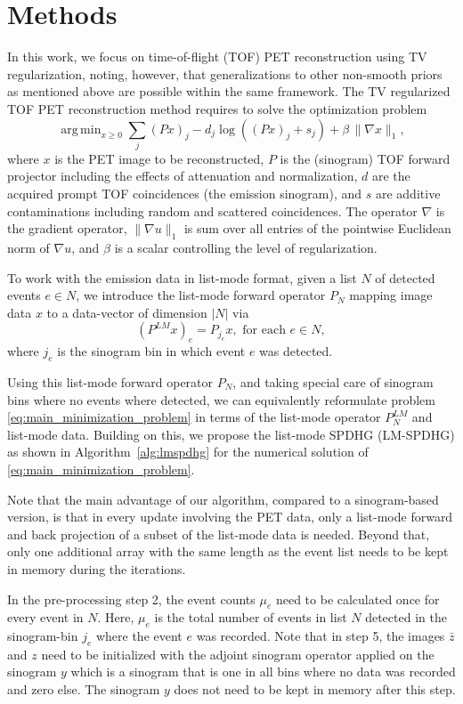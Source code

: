\documentclass{IEEEtran}
\DeclareMathOperator*{\argmin}{arg\,min}
\begin{document}
\section{Methods}

In this work, we focus on time-of-flight (TOF) PET reconstruction using TV regularization, 
noting, however, that generalizations to other non-smooth priors as mentioned above are possible 
within the same framework. 
The TV regularized TOF PET reconstruction method requires to solve the optimization problem
%
\begin{equation} \label{eq:main_minimization_problem}
\argmin _{x\geq 0} \sum_j (Px)_j -  d_j \log \left( (Px)_ j + s_j \right) + \beta \, \|\nabla x\|_{1},
\end{equation}
%
where $x$ is the PET image to be reconstructed, $P$ is the (sinogram) TOF forward projector including 
the effects of attenuation and normalization, $d$ are the acquired prompt TOF coincidences 
(the emission sinogram), and $s$ are additive contaminations including random and scattered coincidences.
The operator $\nabla$ is the gradient operator, $\|\nabla u \|_1$ is sum over all entries of the 
pointwise Euclidean norm of $\nabla u$, and $\beta$ is a scalar controlling the level of regularization.

To work with the emission data in list-mode format, given a list $N$ of detected events $e \in N$, we introduce the list-mode forward operator $P_N$ mapping image data $x$ to a data-vector of dimension $|N|$ via
\[ (P^{LM}x)_e  = P_{j_e}x , \text{ for each }e \in N,\]
where $j_e$ is the sinogram bin in which event $e$ was detected.

Using this list-mode forward operator $P_N$, and taking special care of sinogram bins where no events where detected, we can equivalently reformulate problem \eqref{eq:main_minimization_problem} in terms of the list-mode operator $P^{LM}_N$ and list-mode data. Building on this, we propose the list-mode SPDHG (LM-SPDHG) as shown in Algorithm~\ref{alg:lmspdhg} for the numerical solution of \eqref{eq:main_minimization_problem}.

Note that the main advantage of our algorithm, compared to a sinogram-based version, is that in every update involving the PET data, only a list-mode forward and back projection of
a subset of the list-mode data is needed. Beyond that, only one additional array with the same length
as the event list needs to be kept in memory during the iterations. 

In the pre-processing step 2, the event counts $\mu_e$ need to be calculated once for every event in $N$. Here, $\mu_{e}$ is the total number of events in list $N$ detected in the sinogram-bin $j_e$ where the event $e$ was recorded.
Note that in step 5, the images $\bar{z}$ and $z$ need to be initialized with the adjoint sinogram
operator applied on the sinogram $y$ which is a sinogram that is one in all bins where no data was
recorded and zero else. The sinogram $y$ does not need to be kept in memory after this step.
\end{document}
